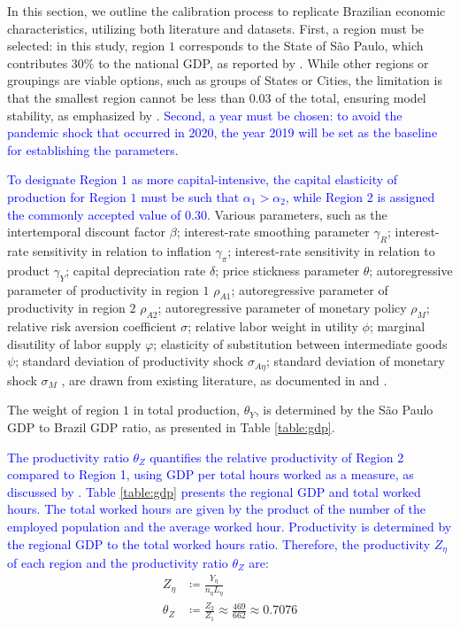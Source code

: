 \documentclass[../thesis.tex]{subfiles}
\begin{document}
In this section, we outline the calibration process to replicate Brazilian economic characteristics, utilizing both literature and datasets. First, a region must be selected: in this study, region $1$ corresponds to the State of São Paulo, which contributes $30\%$ to the national GDP, as reported by \textcite{ibge_GDP_2023}. While other regions or groupings are viable options, such as groups of States or Cities, the limitation is that the smallest region cannot be less than $0.03$ of the total, ensuring model stability, as emphasized by \textcite{konopkova_pitfalls_2019}. \textcolor{blue}{Second, a year must be chosen: to avoid the pandemic shock that occurred in 2020, the year 2019 will be set as the baseline for establishing the parameters.}

\textcolor{blue}{To designate Region $1$ as more capital-intensive, the capital elasticity of production for Region $1$ must be such that $\alpha_{1} > \alpha_{2}$, while Region $2$ is assigned the commonly accepted value of $0.30$.} Various parameters, such as the 
intertemporal discount factor $\beta$; 
interest-rate smoothing parameter $\gamma_{R}$; 
interest-rate sensitivity in relation to inflation $\gamma_{\pi}$; 
interest-rate sensitivity in relation to product $\gamma_{Y}$; 
capital depreciation rate $\delta$; 
price stickness parameter $\theta$;
autoregressive parameter of productivity in region $1$ $\rho_{A1}$;
autoregressive parameter of productivity in region $2$ $\rho_{A2}$;
autoregressive parameter of monetary policy $\rho_{M}$;
relative risk aversion coefficient $\sigma$;
relative labor weight in utility $\phi$;
marginal disutility of labor supply $\varphi$;
elasticity of substitution between intermediate goods $\psi$;
standard deviation of productivity shock $\sigma_{A\eta}$;
standard deviation of monetary shock $\sigma_{M}$
, are drawn from existing literature, as documented in \textcite{costa_junior_understanding_2016} and \textcite{pereira_rbc_2021}.

The weight of region $1$ in total production, $\theta_{Y}$, is determined by the São Paulo GDP to Brazil GDP ratio, as presented in Table \eqref{table:gdp}.

\textcolor{blue}{The productivity ratio $\theta_{Z}$ quantifies the relative productivity of Region 2 compared to Region 1, using GDP per total hours worked as a measure, as discussed by \textcite{krugman_defining_1997}. Table \eqref{table:gdp} presents the regional GDP and total worked hours. The total worked hours are given by the product of the number of the employed population and the average worked hour. Productivity is determined by the regional GDP to the total worked hours ratio. Therefore, the productivity $Z_{\eta}$ of each region and the productivity ratio $\theta_{Z}$ are:}
\begin{align}
	Z_{\eta}  &\coloneqq \frac{Y_{\eta}}{n_{\eta} L_{\eta}} \\
	\theta_{Z} &\coloneqq \frac{Z_{2}}{Z_{1}} \approx \frac{469}{662} \approx 0.7076
\end{align}
\end{document}
